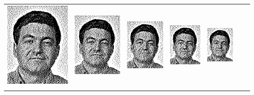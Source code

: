 \begin{tabular}{lllllll}
	\includegraphics{Ediphoto-5-3.png} &
	\includegraphics{Ediphoto-5-4.png} &
	\includegraphics{Ediphoto-5-5.png} &
	\includegraphics{Ediphoto-5-6.png} &
	\includegraphics{Ediphoto-5-7.png} \\
	 &
	 &
	 &
	 &
	 &
	 &
	 \\
\end{tabular}

